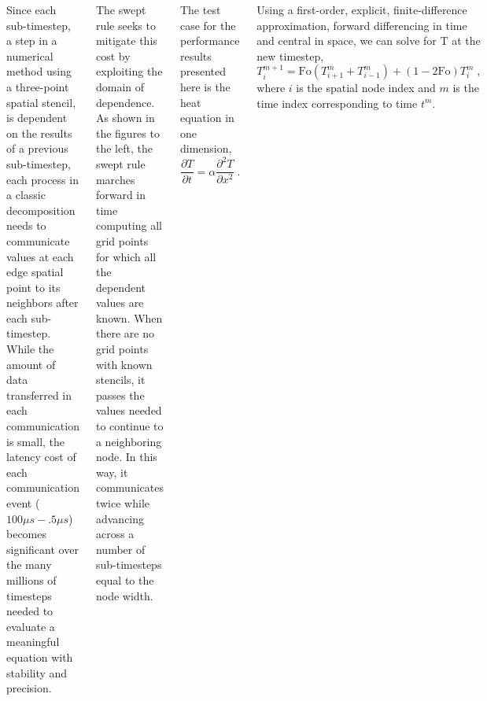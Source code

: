 \documentclass[20pt, a0paper, landscape, margin=0mm, innermargin=15mm, blockverticalspace=15mm, colspace=15mm, subcolspace=8mm]{tikzposter}
\begin{document}
\begin{columns}
{\begin{minipage}[t]{0.69\linewidth}
	\vspace{0.75em}
	
	Since each sub-timestep, a step in a numerical method using a three-point spatial stencil, is dependent on the results of a previous sub-timestep, each process in a classic decomposition needs to communicate values at each edge spatial point to its neighbors after each sub-timestep. While the amount of data transferred in each communication is small, the latency cost of each communication event ($100\mu s - .5\mu s$) becomes significant over the many millions of timesteps needed to evaluate a meaningful equation with stability and precision.
	
	\vspace{0.75em}
	
	The swept rule seeks to mitigate this cost by exploiting the domain of dependence. As shown in the figures to the left, the swept rule marches forward in time computing all grid points for which all the dependent values are known. When there are no grid points with known stencils, it passes the values needed to continue to a neighboring node. In this way, it communicates twice while advancing across a number of sub-timesteps equal to the node width.
	
	\vspace{0.75em}
	
	The test case for the performance results presented here is the heat equation in one dimension, 
	\begin{equation}
	\frac{\partial T}{\partial t} = \alpha \frac{\partial^2 T}{\partial x^2} \;.
	\end{equation}

	Using a first-order, explicit, finite-difference approximation, forward differencing in time and central in space, we can solve for T at the new timestep,
	\begin{equation}
	T_i^{m+1} = \text{Fo} (T_{i+1}^m + T_{i-1}^m) + (1 - 2 \text{Fo}) T_i^m \;,
	\end{equation}
	where $i$ is the spatial node index and $m$ is the time index corresponding to time $t^m$.

	\end{minipage}
    }

\end{columns}
\end{document}
